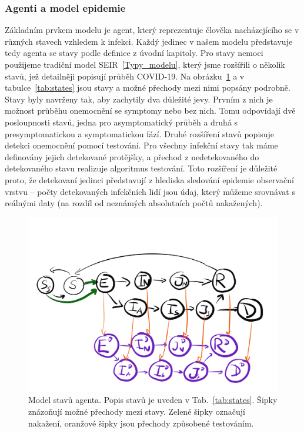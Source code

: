 \subsubsection*{Agenti a model epidemie}

Základním prvkem modelu je agent, který reprezentuje člověka nacházejícího se v různých stavech vzhledem k infekci. Každý jedinec v našem modelu představuje tedy agenta se stavy podle definice z úvodní kapitoly. Pro stavy nemoci použijeme tradiční model SEIR~\ref{Typy_modelu}, který jsme rozšířili o několik stavů, jež detailněji popisují průběh COVID-19. Na obrázku~\ref{fig:model-states} a v tabulce~\ref{tab:states} jsou stavy a možné přechody mezi nimi popsány podrobně. Stavy byly navrženy tak, aby zachytily dva důležité jevy. Prvním z nich je možnost průběhu onemocnění se symptomy nebo bez nich. Tomu odpovídají dvě posloupnosti stavů, jedna pro asymptomatický průběh a druhá s presymptomatickou a symptomatickou fází. Druhé rozšíření stavů popisuje detekci onemocnění pomocí testování. Pro všechny infekční stavy tak máme definovány jejich detekované protějšky, a přechod z nedetekovaného do detekovaného stavu realizuje algoritmus testování. Toto rozšíření je důležité proto, že detekovaní jedinci představují z hlediska sledování epidemie observační vrstvu -- počty detekovaných infekčních lidí jsou údaj, který můžeme srovnávat s reálnými daty (na rozdíl od neznámých absolutních počtů nakažených).

    

\begin{figure}%
\centerline{%
\includegraphics[width=0.99\columnwidth]{pic/epi08}%
}
\caption{Model stavů agenta. Popis stavů je uveden v Tab.~\ref{tab:states}. Šipky znázoňují možné přechody mezi stavy. Zelené šipky označují nakažení, oranžové šipky jsou přechody způsobené testováním.}%
\label{fig:model-states}%
\end{figure}


